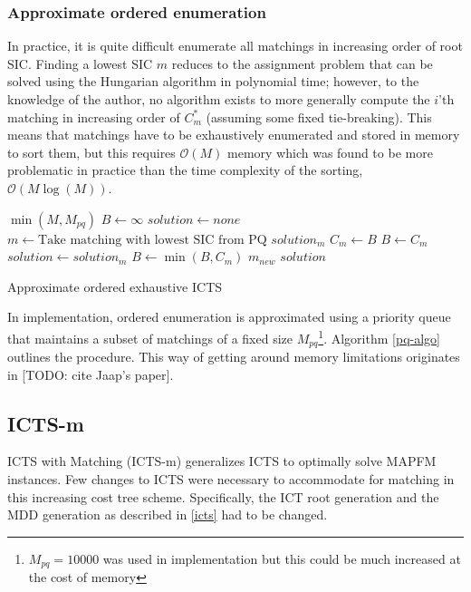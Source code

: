 \documentclass[english,10pt]{article}
\begin{document}
	\subsubsection{Approximate ordered enumeration}
	In practice, it is quite difficult enumerate all matchings in increasing order of root SIC. Finding a lowest SIC $m$ reduces to the assignment problem that can be solved using the Hungarian algorithm \cite{kuhn55} in polynomial time; however, to the knowledge of the author, no algorithm exists to more generally compute the $i$'th matching in increasing order of $C^*_m$ (assuming some fixed tie-breaking). This means that matchings have to be exhaustively enumerated and stored in memory to sort them, but this requires $\mathcal{O}(M)$ memory which was found to be more problematic in practice than the time complexity of the sorting, $\mathcal{O}(M\log(M))$.
	
		\begin{algorithm}
		\begin{algorithmic}[1]
			\State {}$\min(M,M_{pq})$
			\State $B \gets \infty$
			\State $solution \gets none$
			\Repeat
			\State $m\gets\text{Take matching with lowest SIC from PQ}$
			\State $solution_m$  $C_m\gets$$B$ 
			\State $B\gets C_m$
			\State $solution \gets solution_m$
			\EndIf
			\State $B\gets\min(B,C_m)$
			\State {}$m_{new}$
			\EndIf
			\Return $solution$
		\end{algorithmic}
		\caption{Approximate ordered exhaustive ICTS} 
		\label{pq-algo}
	\end{algorithm}

	In implementation, ordered enumeration is approximated using a priority queue that maintains a subset of matchings of a fixed size $M_{pq}$\footnote{$M_{pq} = 10000$ was used in implementation but this could be much increased at the cost of memory}. Algorithm \ref{pq-algo} outlines the procedure. This way of getting around memory limitations originates in [TODO: cite Jaap's paper].
	
	\subsection{ICTS-m}
	ICTS with Matching (ICTS-m) generalizes ICTS to optimally solve MAPFM instances. Few changes to ICTS were necessary to accommodate for matching in this increasing cost tree scheme. Specifically, the ICT root generation and the MDD generation as described in \ref{icts} had to be changed.
\end{document}
